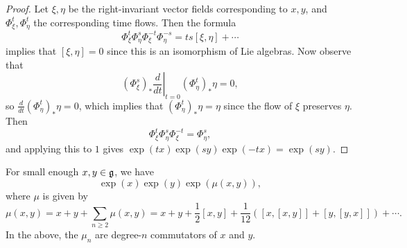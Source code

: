 \begin{proof}
  Let $\xi, \eta$ be the right-invariant
  vector fields corresponding to $x, y$,
  and $\Phi^t_\xi, \Phi^t_\eta$
  the corresponding time flows.
  Then the formula
  \[
    \Phi^t_{\xi}
    \Phi^s_{\eta}
    \Phi^{-t}_{\xi}
    \Phi^{-s}_{\eta}
    = ts[\xi, \eta] + \cdots
  \]
  implies that $[\xi, \eta] = 0$
  since this is an isomorphism of
  Lie algebras. Now observe that
  \[
    (\Phi^s_{\xi})_*
    \left.\frac{d}{dt}\right|_{t = 0}
    (\Phi^t_{\eta})_* \eta = 0,
  \]
  so $\frac{d}{dt} (\Phi^t_{\eta})_* \eta = 0$, which
  implies that
  $(\Phi^t_{\eta})_* \eta = \eta$ since
  the flow of $\xi$ preserves $\eta$.
  Then
  \[
    \Phi^t_{\xi} \Phi^s_{\eta}
    \Phi^{-t}_{\xi}
    = \Phi^s_{\eta},
  \]
  and applying this to $1$ gives
  $\exp(tx) \exp(sy) \exp(-tx) = \exp(sy)$.
\end{proof}

\begin{theorem}
  For small enough $x, y \in \mathfrak{g}$, we have
  \[
    \exp(x) \exp(y)
    \exp(\mu(x, y)),
  \]
  where $\mu$ is given by
  \[
    \mu(x, y) = x + y + \sum_{n \ge 2} \mu(x, y)
    = x + y + \frac{1}{2} [x, y]
    + \frac{1}{12} ([x, [x, y]] + [y, [y, x]])
    + \cdots.
  \]
  In the above, the $\mu_n$ are
  degree-$n$ commutators
  of $x$ and $y$.
\end{theorem}
